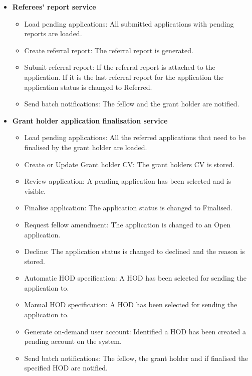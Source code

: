 \documentclass[12pt]{article}
\begin{document}
\begin{itemize}
	\item \textbf{Referees' report service}
		\begin{itemize}
			\item Load pending applications: All submitted applications with pending reports are loaded.
			\item Create referral report: The referral report is generated.				
			\item Submit referral report: If the referral report is attached to the application. If it is the last referral report for the application the application status is changed to Referred.
			\item Send batch notifications: The fellow and the grant holder are notified.									
		\end{itemize}
		
	\item \textbf{Grant holder application finalisation service}
		\begin{itemize}
			\item Load pending applications: All the referred applications that need to be finalised by the grant holder are loaded.
			\item Create or Update Grant holder CV: The grant holders CV is stored.
			\item Review application: A pending application has been selected and is visible.
			\item Finalise application: The application status is changed to Finalised.
			\item Request fellow amendment: The application is changed to an Open application.
			\item Decline: The application status is changed to declined and the reason is stored.
			\item Automatic HOD specification: A HOD has been selected for sending the application to.
			\item Manual HOD specification: A HOD has been selected for sending the application to.
			\item Generate on-demand user account: Identified a HOD has been created a pending account on the system.
			\item Send batch notifications: The fellow, the grant holder and if finalised the specified HOD are notified.								
		\end{itemize}
			

\end{itemize}
\end{document}
